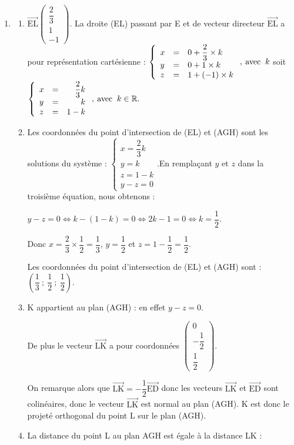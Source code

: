 \documentclass[10pt]{article}
\providecommand{\R}{\mathbb{R}}
\providecommand{\vect}[1]{\overrightarrow{#1}}
\begin{document}
\begin{enumerate}
		Or $\text{A}\in \text{(ART)}$ donc $0-0+d=0$ donc $d=0$. Donc (AGH) a pour équation $y - z = 0$.
		\item \begin{enumerate}
			\item $\vect{\text{EL}}\begin{pmatrix}\dfrac23\\1\\-1\end{pmatrix}$. La droite (EL) passant par E et de vecteur directeur $\vect{\text{EL}}$ a pour représentation cartésienne :
			$\left\{\begin{array}{l c l}x&=&0+\dfrac23\times k\\y&=&0 +1\times k\\z &=&1+(-1)\times k \end{array}\right.,\: \text{avec }\:k$ soit $\left\{\begin{array}{l c r}x&=&\dfrac23 k\\y&=&k\\z &=&1- k \end{array}\right.,\: \text{avec }\:k \in \R.$
			\item Les coordonnées du point d'intersection de (EL) et (AGH) sont les solutions du système : $\left\{\begin{array}{l}x=\dfrac23 k\\y=k\\z =1- k \\ y-z=0 \end{array}\right.$.En remplaçant $y$ et $z$ dans la troisième équation, nous obtenons :

$y-z=0  \iff  k-(1-k)=0  \iff  2k-1=0 \iff k=\dfrac12$. 

Donc $x=\dfrac23 \times \dfrac12=\dfrac13$, $y=\dfrac12$ et $z=1-\dfrac12=\dfrac12$.
			
Les coordonnées du point d'intersection de (EL) et (AGH) sont : $\left(\dfrac13~;~\dfrac12~;~\dfrac12\right)$.
			\item K appartient au plan (AGH) : en effet $y - z=0$.
			
De plus  le vecteur $\vect{\text{LK}}$ a pour coordonnées $\begin{pmatrix}0\\-\dfrac12\\\dfrac12\end{pmatrix}$.
			
On remarque alors que $\vect{\text{LK}}=-\dfrac12\vect{\text{ED}}$ donc les vecteurs $\vect{\text{LK}}$ et $\vect{\text{ED}}$ sont colinéaires, donc le vecteur $\vect{\text{LK}}$ est normal au plan (AGH). K est donc le projeté orthogonal du point L sur le plan (AGH).
			\item La distance du point L au plan AGH est égale à la distance LK :
			

\end{enumerate}
\end{enumerate}
\end{document}
